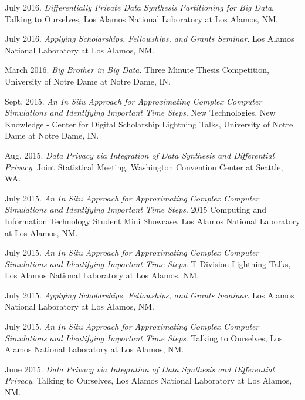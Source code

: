\documentclass[11pt, letterpaper, roman]{moderncv} %
\begin{document}
\begin{etaremune}[topsep=0pt, itemsep=4pt, partopsep=0pt, parsep=0pt]
    \item July 2016. \textit{Differentially Private Data Synthesis Partitioning for Big Data}. Talking to Ourselves, Los Alamos National Laboratory at Los Alamos, NM.
    
    \item July 2016. \textit{Applying Scholarships, Fellowships, and Grants Seminar}. Los Alamos National Laboratory at Los Alamos, NM.
    
    \item March 2016. \textit{Big Brother in Big Data}. Three Minute Thesis Competition, University of Notre Dame at Notre Dame, IN.
    
    \item Sept. 2015. \textit{An In Situ Approach for Approximating Complex Computer Simulations and Identifying Important Time Steps}. New Technologies, New Knowledge - Center for Digital Scholarship Lightning Talks, University of Notre Dame at Notre Dame, IN.
    
    \item Aug. 2015. \textit{Data Privacy via Integration of Data Synthesis and Differential Privacy}. Joint Statistical Meeting, Washington Convention Center at Seattle, WA.
    
    \item July 2015. \textit{An In Situ Approach for Approximating Complex Computer Simulations and Identifying Important Time Steps}. 2015 Computing and Information Technology Student Mini Showcase, Los Alamos National Laboratory at Los Alamos, NM.
    
    \item July 2015. \textit{An In Situ Approach for Approximating Complex Computer Simulations and Identifying Important Time Steps}. T Division Lightning Talks, Los Alamos National Laboratory at Los Alamos, NM.
    
    \item July 2015. \textit{Applying Scholarships, Fellowships, and Grants Seminar}. Los Alamos National Laboratory at Los Alamos, NM.
    
    \item July 2015. \textit{An In Situ Approach for Approximating Complex Computer Simulations and Identifying Important Time Steps}. Talking to Ourselves, Los Alamos National Laboratory at Los Alamos, NM.
    
    \item June 2015. \textit{Data Privacy via Integration of Data Synthesis and Differential Privacy}. Talking to Ourselves, Los Alamos National Laboratory at Los Alamos, NM. 
    

\end{etaremune}
\end{document}
